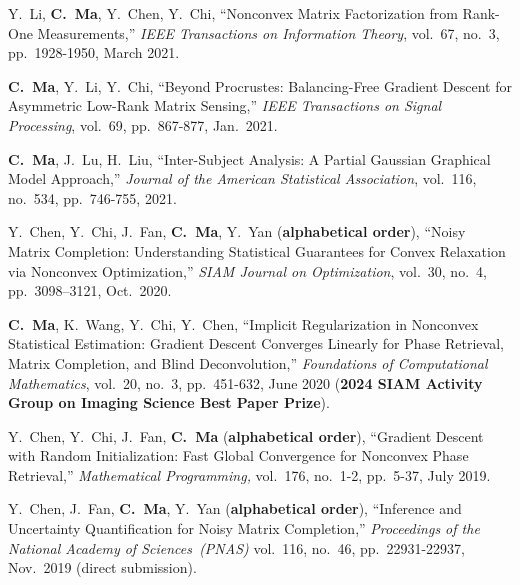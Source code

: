 \documentclass[a4paper, 10pt]{article}
\newenvironment{changemargin}[2]{%
  \begin{list}{}{%
    \setlength{\topsep}{0pt}%
    \setlength{\leftmargin}{#1}%
    \setlength{\rightmargin}{#2}%
    \setlength{\listparindent}{\parindent}%
    \setlength{\itemindent}{\parindent}%
    \setlength{\parsep}{\parskip}%
  }%
  \item[]}{\end{list}
}
\newenvironment{body} {
	\vspace*{-16pt}
	\begin{changemargin}{-0.3in}{-0.5in}
  }	
	{\end{changemargin}
}
\begin{document}
\begin{body}
\begin{enumerate}[label={[{J}{{\arabic*}}]}]
\item Y.~Li, \textbf{C.~Ma}, Y.~Chen, Y.~Chi, {``Nonconvex Matrix Factorization from Rank-One Measurements,''} \emph{IEEE Transactions on Information Theory}, vol.~67, no.~3, pp.~1928-1950, March 2021.

\item \textbf{C.~Ma}, Y.~Li, Y.~Chi, {``Beyond Procrustes: Balancing-Free Gradient Descent for Asymmetric Low-Rank Matrix Sensing,''} \emph{IEEE Transactions on Signal Processing}, vol.~69, pp.~867-877, Jan.~2021.


	
\item	\textbf{C.~Ma}, J.~Lu, H.~Liu, {{``Inter-Subject Analysis: A Partial Gaussian Graphical Model Approach,''}}  \emph{Journal of the American Statistical Association}, vol.~116, no.~534, pp.~746-755, 2021. \\

\item Y.~Chen, Y.~Chi, J.~Fan, \textbf{C.~Ma}, Y.~Yan (\textbf{alphabetical order}), {``Noisy Matrix Completion: Understanding Statistical Guarantees for Convex Relaxation via Nonconvex Optimization,''} \emph{SIAM Journal on Optimization}, vol.~30, no.~4, pp.~3098–3121, Oct.~2020. \\

\item \textbf{C.~Ma}, K.~Wang, Y.~Chi, Y.~Chen, {{``Implicit Regularization in Nonconvex Statistical Estimation: Gradient Descent Converges Linearly for Phase Retrieval, Matrix Completion, and Blind Deconvolution,''}}  \emph{Foundations of Computational Mathematics}, vol.~20, no.~3, pp.~451-632, June
2020  (\textbf{2024 SIAM Activity Group on Imaging Science Best Paper Prize}). \\


\item Y.~Chen, Y.~Chi, J.~Fan, \textbf{C.~Ma} (\textbf{alphabetical order}), {``Gradient Descent with Random Initialization: Fast Global Convergence for Nonconvex Phase Retrieval,''} \emph{Mathematical Programming,} vol.~176, no.~1-2, pp.~5-37, July 2019. \\


\item Y.~Chen, J.~Fan, \textbf{C.~Ma}, Y.~Yan (\textbf{alphabetical order}), {``Inference and Uncertainty Quantification for Noisy Matrix Completion,''} \emph{Proceedings of the National Academy of Sciences~(PNAS)} vol.~116, no.~46, pp.~22931-22937, Nov.~2019 (direct submission). \\





\end{enumerate}
\end{body}
\end{document}
